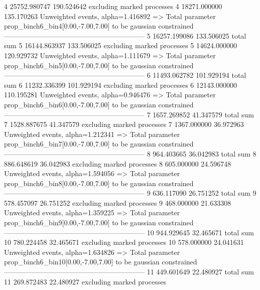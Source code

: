 4          25752.980747    190.524642      excluding marked processes    
4          18271.000000    135.170263      Unweighted events, alpha=1.416892
  => Total parameter prop_binch6_bin4[0.00,-7.00,7.00] to be gaussian constrained
------------------------------------------------------------
5          16257.199086    133.506025      total sum                     
5          16144.863937    133.506025      excluding marked processes    
5          14624.000000    120.929732      Unweighted events, alpha=1.111679
  => Total parameter prop_binch6_bin5[0.00,-7.00,7.00] to be gaussian constrained
------------------------------------------------------------
6          11493.062782    101.929194      total sum                     
6          11232.336399    101.929194      excluding marked processes    
6          12143.000000    110.195281      Unweighted events, alpha=0.946476
  => Total parameter prop_binch6_bin6[0.00,-7.00,7.00] to be gaussian constrained
------------------------------------------------------------
7          1657.269852     41.347579       total sum                     
7          1528.887675     41.347579       excluding marked processes    
7          1367.000000     36.972963       Unweighted events, alpha=1.212341
  => Total parameter prop_binch6_bin7[0.00,-7.00,7.00] to be gaussian constrained
------------------------------------------------------------
8          964.403665      36.042983       total sum                     
8          886.648619      36.042983       excluding marked processes    
8          605.000000      24.596748       Unweighted events, alpha=1.594056
  => Total parameter prop_binch6_bin8[0.00,-7.00,7.00] to be gaussian constrained
------------------------------------------------------------
9          636.117090      26.751252       total sum                     
9          578.457097      26.751252       excluding marked processes    
9          468.000000      21.633308       Unweighted events, alpha=1.359225
  => Total parameter prop_binch6_bin9[0.00,-7.00,7.00] to be gaussian constrained
------------------------------------------------------------
10         944.929645      32.465671       total sum                     
10         780.224458      32.465671       excluding marked processes    
10         578.000000      24.041631       Unweighted events, alpha=1.634826
  => Total parameter prop_binch6_bin10[0.00,-7.00,7.00] to be gaussian constrained
------------------------------------------------------------
11         449.601649      22.480927       total sum                     
11         269.872483      22.480927       excluding marked processes    
